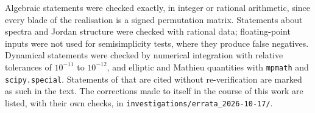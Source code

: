 Algebraic statements were checked exactly, in integer or rational arithmetic, since every blade of the realisation is a signed permutation
matrix. Statements about spectra and Jordan structure were checked with rational data; floating-point inputs were not used for
semisimplicity tests, where they produce false negatives. Dynamical statements were checked by numerical integration with relative
tolerances of $10^{-11}$ to $10^{-12}$, and elliptic and Mathieu quantities with \texttt{mpmath} and \texttt{scipy.special}. Statements of
\cite{ES17} that are cited without re-verification are marked as such in the text. The corrections made to \cite{ES17} itself in the course
of this work are listed, with their own checks, in \texttt{investigations/errata\_2026-10-17/}.
